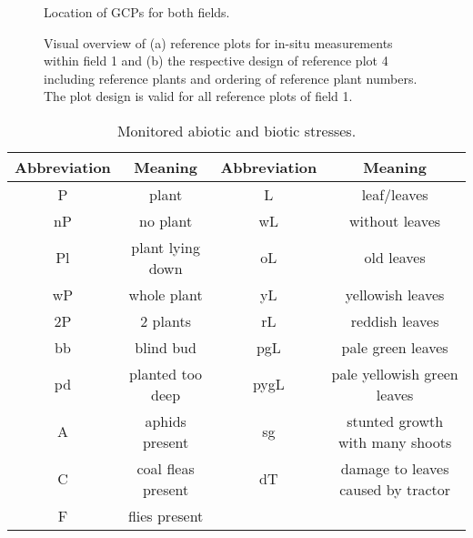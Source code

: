 \documentclass{article}
\begin{document}



% 



\newpage
\begin{appendices}


\begin{figure}[h]
	\centering
	\caption{Location of GCPs for both fields.}
	\label{fig:gcp_location}
\end{figure}

\begin{figure}[h]
	\centering
    \hspace{10pt}
 	\caption{Visual overview of (a) reference plots for in-situ measurements within field 1
and (b) the respective design of reference plot 4 including reference plants and ordering of reference plant numbers. The plot design is valid for all reference plots of field 1.}
	\label{fig:refPlots_field1}
\end{figure}  


\begin{table}[h]
\caption{Monitored abiotic and biotic stresses.}\label{table:stresses}
\begin{center}
\begin{tabular}{|c|c||c|c|}
    \hline
    Abbreviation & Meaning & Abbreviation & Meaning \\
    \hline
        P	& plant &  L	& leaf/leaves \\
        nP	& no plant &   wL	& without leaves \\
        Pl	& plant lying down &    oL	& old leaves \\
        wP	& whole plant &   yL	&  yellowish leaves \\
        2P	& 2 plants & 	rL	& reddish leaves \\
        bb	& blind bud &  pgL	& pale green leaves  \\
        pd	& planted too deep &  pygL & pale yellowish green leaves \\
        A & aphids present & sg	& stunted growth with many shoots\\
        C	& coal fleas present & dT	& damage to leaves caused by tractor\\
        F & flies present & & \\
    \hline
\end{tabular}
\end{center}
\end{table}



\end{appendices}
\end{document}
